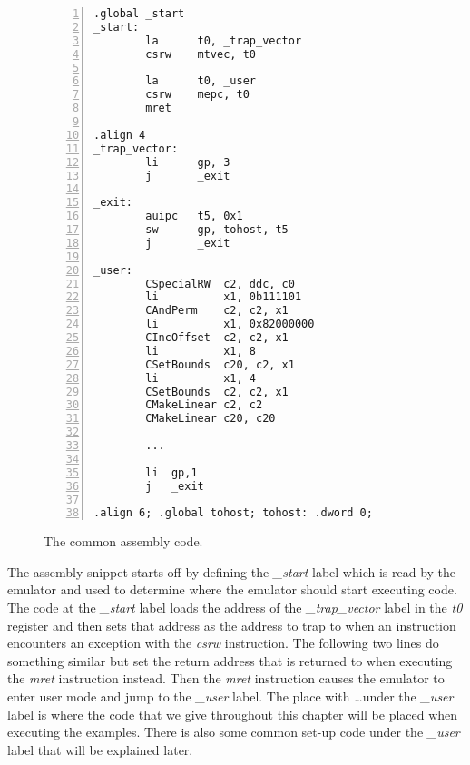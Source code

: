 \begin{figure}[h]
\begin{lstlisting}[style=custASM, numbers = left ,xleftmargin=1.5em]
        .global _start
_start:
        la      t0, _trap_vector
        csrw	mtvec, t0

        la      t0, _user
        csrw    mepc, t0
        mret

.align 4
_trap_vector:
        li      gp, 3
        j       _exit

_exit:
        auipc   t5, 0x1
        sw      gp, tohost, t5
        j       _exit

_user:
        CSpecialRW  c2, ddc, c0
        li          x1, 0b111101
        CAndPerm    c2, c2, x1
        li          x1, 0x82000000
        CIncOffset  c2, c2, x1
        li          x1, 8
        CSetBounds  c20, c2, x1
        li          x1, 4
        CSetBounds  c2, c2, x1
        CMakeLinear c2, c2
        CMakeLinear c20, c20
        
        ...
        
        li  gp,1
        j   _exit

.align 6; .global tohost; tohost: .dword 0;
\end{lstlisting}
\caption{The common assembly code.}
\label{fig:commonasm}
\end{figure}

The assembly snippet starts off by defining the \textit{\_start} label which is read by the emulator and used to determine where the emulator should start executing code.
The code at the \textit{\_start} label loads the address of the \textit{\_trap\_vector} label in the \textit{t0} register and then sets that address as the address to trap to when an instruction encounters an exception with the \textit{csrw} instruction.
The following two lines do something similar but set the return address that is returned to when executing the \textit{mret} instruction instead.
Then the \textit{mret} instruction causes the emulator to enter user mode and jump to the \textit{\_user} label.
The place with \ldots under the \textit{\_user} label is where the code that we give throughout this chapter will be placed when executing the examples.
There is also some common set-up code under the \textit{\_user} label that will be explained later.

